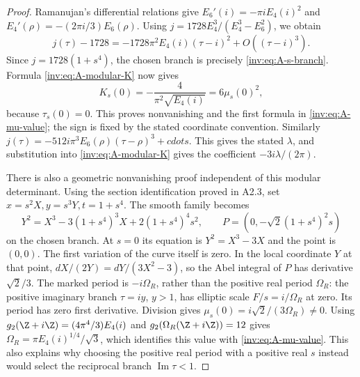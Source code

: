 \begin{proof}
Ramanujan's differential relations give
$E_6'(i)=-\pi i E_4(i)^2$ and
$E_4'(\rho)=-(2\pi i/3)E_6(\rho)$.
Using $j=1728E_4^3/(E_4^3-E_6^2)$, we obtain
\[
j(\tau)-1728=-1728\pi^2E_4(i)(\tau-i)^2+O((\tau-i)^3).
\]
Since $j=1728(1+s^4)$, the chosen branch is precisely
\eqref{inv:eq:A-s-branch}.  Formula \eqref{inv:eq:A-modular-K} now gives
\[
K_s(0)=-\frac4{\pi^2\sqrt{E_4(i)}}=6\mu_s(0)^2,
\]
because $\tau_s(0)=0$.  This proves nonvanishing and the first
formula in \eqref{inv:eq:A-mu-value}; the sign is fixed by the stated
coordinate convention.  Similarly
$j(\tau)=-512i\pi^3E_6(\rho)(\tau-\rho)^3+cdots$.
This gives the stated $\lambda$, and substitution into
\eqref{inv:eq:A-modular-K} gives the coefficient $-3i\lambda/(2\pi)$.

There is also a geometric nonvanishing proof independent of this
modular determinant.  Using the section identification proved in
A2.3, set $x=s^2X,y=s^3Y,t=1+s^4$.  The smooth family becomes
\[
Y^2=X^3-3(1+s^4)^3X+2(1+s^4)^4s^2,
\qquad P=(0,-\sqrt2(1+s^4)^2s)
\]
on the chosen branch.  At $s=0$ its equation is
$Y^2=X^3-3X$ and the point is $(0,0)$.  The first variation of the
curve itself is zero.  In the local coordinate $Y$ at that point,
$dX/(2Y)=dY/(3X^2-3)$, so the Abel integral of $P$ has derivative
$\sqrt2/3$.  The marked period is $-i\Omega_R$, rather than the
positive real period $\Omega_R$: the positive imaginary branch
$\tau=iy$, $y>1$, has elliptic scale $F/s=i/\Omega_R$ at zero.
Its period has zero first derivative.  Division gives
$\mu_s(0)=i\sqrt2/(3\Omega_R)\ne0$.
Using $g_2(\Z+i\Z)=(4\pi^4/3)E_4(i)$ and
$g_2(\Omega_R(\Z+i\Z))=12$ gives
$\Omega_R=\pi E_4(i)^{1/4}/\sqrt3$, which identifies this value
with \eqref{inv:eq:A-mu-value}.  This also explains why choosing the
positive real period with a positive real $s$ instead would select
the reciprocal branch $\operatorname{Im}\tau<1$.


\end{proof}
